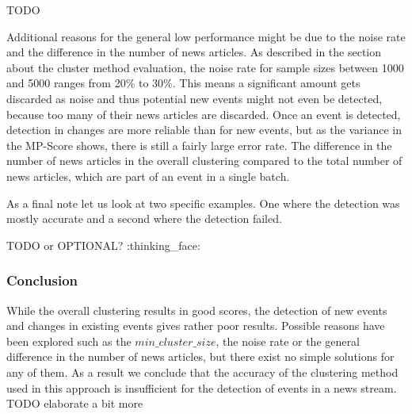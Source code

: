 TODO

Additional reasons for the general low performance might be due to the noise rate and the difference in the number of news articles. As described in the section about the cluster method evaluation, the noise rate for sample sizes between 1000 and 5000 ranges from 20\% to 30\%. This means a significant amount gets discarded as noise and thus potential new events might not even be detected, because too many of their news articles are discarded. Once an event is detected, detection in changes are more reliable than for new events, but as the variance in the MP-Score shows, there is still a fairly large error rate. The difference in the number of news articles in the overall clustering compared to the total number of news articles, which are part of an event in a single batch.      

As a final note let us look at two specific examples. One where the detection was mostly accurate and a second where the detection failed.

TODO or OPTIONAL? :thinking_face:

\subsubsection{Conclusion}

While the overall clustering results in good scores, the detection of new events and changes in existing events gives rather poor results. Possible reasons have been explored such as the $min\_cluster\_size$, the noise rate or the general difference in the number of news articles, but there exist no simple solutions for any of them. As a result we conclude that the accuracy of the clustering method used in this approach is insufficient for the detection of events in a news stream. TODO elaborate a bit more